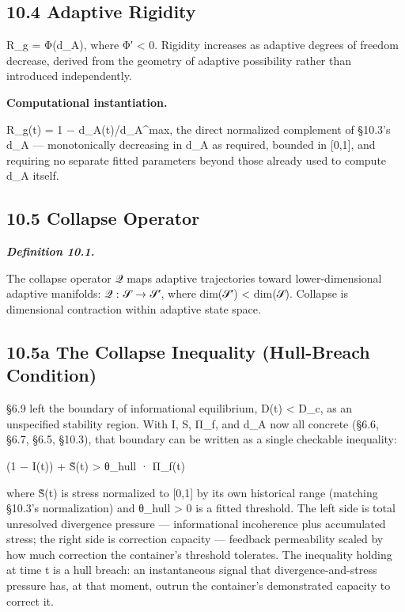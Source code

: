 \documentclass[
]{article}
\begin{document}
\hypertarget{adaptive-rigidity}{%
\subsection{10.4 Adaptive Rigidity}\label{adaptive-rigidity}}

R\_g = Φ(d\_A), where Φ′ \textless{} 0. Rigidity increases as adaptive
degrees of freedom decrease, derived from the geometry of adaptive
possibility rather than introduced independently.

\textbf{Computational instantiation.}

R\_g(t) = 1 − d\_A(t)/d\_A\^{}max, the direct normalized complement of
§10.3's d\_A --- monotonically decreasing in d\_A as required, bounded
in {[}0,1{]}, and requiring no separate fitted parameters beyond those
already used to compute d\_A itself.

\hypertarget{collapse-operator}{%
\subsection{10.5 Collapse Operator}\label{collapse-operator}}

\emph{\textbf{Definition 10.1.}}

The collapse operator 𝒬 maps adaptive trajectories toward
lower-dimensional adaptive manifolds: 𝒬 : 𝒮 → 𝒮′, where dim(𝒮′)
\textless{} dim(𝒮). Collapse is dimensional contraction within adaptive
state space.

\hypertarget{a-the-collapse-inequality-hull-breach-condition}{%
\subsection{10.5a The Collapse Inequality (Hull-Breach
Condition)}\label{a-the-collapse-inequality-hull-breach-condition}}

§6.9 left the boundary of informational equilibrium, D(t) \textless{}
D\_c, as an unspecified stability region. With I, S, Π\_f, and d\_A now
all concrete (§6.6, §6.7, §6.5, §10.3), that boundary can be written as
a single checkable inequality:

(1 − I(t)) + S̃(t) \textgreater{} θ\_hull · Π\_f(t)

where S̃(t) is stress normalized to {[}0,1{]} by its own historical range
(matching §10.3's normalization) and θ\_hull \textgreater{} 0 is a
fitted threshold. The left side is total unresolved divergence pressure
--- informational incoherence plus accumulated stress; the right side is
correction capacity --- feedback permeability scaled by how much
correction the container's threshold tolerates. The inequality holding
at time t is a hull breach: an instantaneous signal that
divergence-and-stress pressure has, at that moment, outrun the
container's demonstrated capacity to correct it.
\end{document}
